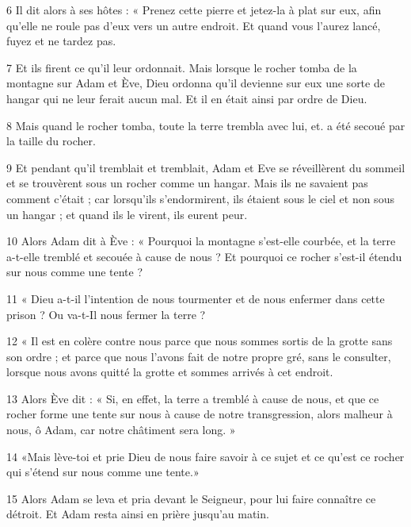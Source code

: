 \par 6 Il dit alors à ses hôtes : « Prenez cette pierre et jetez-la à plat sur eux, afin qu'elle ne roule pas d'eux vers un autre endroit. Et quand vous l’aurez lancé, fuyez et ne tardez pas.

\par 7 Et ils firent ce qu'il leur ordonnait. Mais lorsque le rocher tomba de la montagne sur Adam et Ève, Dieu ordonna qu'il devienne sur eux une sorte de hangar qui ne leur ferait aucun mal. Et il en était ainsi par ordre de Dieu.

\par 8 Mais quand le rocher tomba, toute la terre trembla avec lui, et. a été secoué par la taille du rocher.

\par 9 Et pendant qu'il tremblait et tremblait, Adam et Eve se réveillèrent du sommeil et se trouvèrent sous un rocher comme un hangar. Mais ils ne savaient pas comment c’était ; car lorsqu'ils s'endormirent, ils étaient sous le ciel et non sous un hangar ; et quand ils le virent, ils eurent peur.

\par 10 Alors Adam dit à Ève : « Pourquoi la montagne s'est-elle courbée, et la terre a-t-elle tremblé et secouée à cause de nous ? Et pourquoi ce rocher s’est-il étendu sur nous comme une tente ?

\par 11 « Dieu a-t-il l'intention de nous tourmenter et de nous enfermer dans cette prison ? Ou va-t-Il nous fermer la terre ?

\par 12 « Il est en colère contre nous parce que nous sommes sortis de la grotte sans son ordre ; et parce que nous l'avons fait de notre propre gré, sans le consulter, lorsque nous avons quitté la grotte et sommes arrivés à cet endroit.

\par 13 Alors Ève dit : « Si, en effet, la terre a tremblé à cause de nous, et que ce rocher forme une tente sur nous à cause de notre transgression, alors malheur à nous, ô Adam, car notre châtiment sera long. »

\par 14 «Mais lève-toi et prie Dieu de nous faire savoir à ce sujet et ce qu'est ce rocher qui s'étend sur nous comme une tente.»

\par 15 Alors Adam se leva et pria devant le Seigneur, pour lui faire connaître ce détroit. Et Adam resta ainsi en prière jusqu'au matin.

